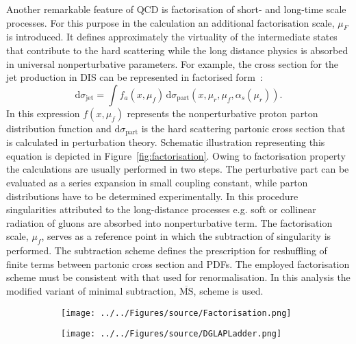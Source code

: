 Another remarkable feature of QCD is factorisation of short- and long-time scale processes. For this purpose in the calculation an additional factorisation scale, $\mu_F$ is introduced. It defines approximately the virtuality of the intermediate states that contribute to the hard scattering while the long distance physics is absorbed in universal nonperturbative parameters. For example, the cross section for the jet production in DIS can be represented in factorised form~\cite{Collins Factorization of Hard Processes in}:
\begin{equation}
 \mathrm{d}\sigma_{\mathrm{jet}} = \int{f_a\left(x,\mu_f\right)}\, \mathrm{d}\sigma_{\mathrm{part}}\left(x,\mu_r, \mu_f, \alpha_s\left(\mu_r\right) \right).
\label{eq:disfactorisation}
\end{equation} 
In this expression $f\left(x,\mu_f\right)$ represents the nonperturbative proton parton distribution function and $\mathrm{d}\sigma_{\mathrm{part}}$ is the hard scattering partonic cross section that is calculated in perturbation theory. Schematic illustration representing this equation is depicted in Figure~\ref{fig:factorisation}. Owing to factorisation property the calculations are usually performed in two steps. The perturbative part can be evaluated as a series expansion in small coupling constant, while parton distributions have to be determined experimentally. In this procedure singularities attributed to the long-distance processes e.g. soft or collinear radiation of gluons are absorbed into nonperturbative term. The factorisation scale, $\mu_f$, serves as a reference point in which the subtraction of singularity is performed. The subtraction scheme defines the prescription for reshuffling of finite terms between partonic cross section and PDFs. The employed factorisation scheme must be consistent with that used for renormalisation. In this analysis the modified variant of minimal subtraction, $\overline{\mathrm{MS}}$, scheme is used.
\begin{figure}[t]
	\centering
	\begin{subfigure}{.49\textwidth}
		\centering
		\texttt{[image: ../../Figures/source/Factorisation.png]}
		\caption{ }
		\label{fig:Factorisation}
	\end{subfigure}
	\begin{subfigure}{.49\textwidth}
		\texttt{[image: ../../Figures/source/DGLAPLadder.png]}
		\caption{ }
		\label{fig:DGLAPLadder}
	\end{subfigure}
	\caption{}
\label{fig:factorisationdglapladder}
\end{figure}
